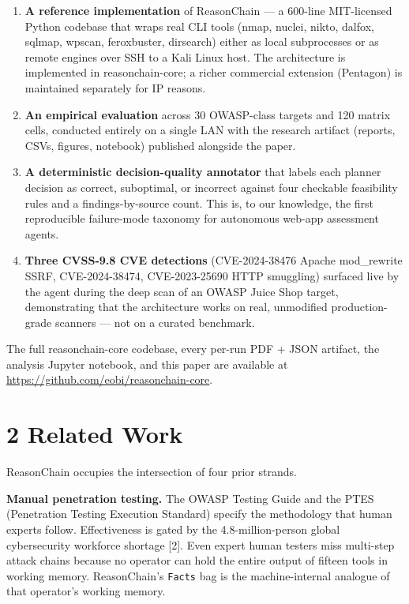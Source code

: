 \documentclass[
]{article}
\begin{document}
\begin{enumerate}
\def\labelenumi{\arabic{enumi}.}
\item
  \textbf{A reference implementation} of ReasonChain --- a 600-line
  MIT-licensed Python codebase that wraps real CLI tools (nmap, nuclei,
  nikto, dalfox, sqlmap, wpscan, feroxbuster, dirsearch) either as local
  subprocesses or as remote engines over SSH to a Kali Linux host. The
  architecture is implemented in reasonchain-core; a richer commercial
  extension (Pentagon) is maintained separately for IP reasons.
\item
  \textbf{An empirical evaluation} across 30 OWASP-class targets and 120
  matrix cells, conducted entirely on a single LAN with the research
  artifact (reports, CSVs, figures, notebook) published alongside the
  paper.
\item
  \textbf{A deterministic decision-quality annotator} that labels each
  planner decision as correct, suboptimal, or incorrect against four
  checkable feasibility rules and a findings-by-source count. This is,
  to our knowledge, the first reproducible failure-mode taxonomy for
  autonomous web-app assessment agents.
\item
  \textbf{Three CVSS-9.8 CVE detections} (CVE-2024-38476 Apache
  mod\_rewrite SSRF, CVE-2024-38474, CVE-2023-25690 HTTP smuggling)
  surfaced live by the agent during the deep scan of an OWASP Juice Shop
  target, demonstrating that the architecture works on real, unmodified
  production-grade scanners --- not on a curated benchmark.
\end{enumerate}

The full reasonchain-core codebase, every per-run PDF + JSON artifact,
the analysis Jupyter notebook, and this paper are available at
\url{https://github.com/eobi/reasonchain-core}.

\section{2 Related Work}\label{related-work}

ReasonChain occupies the intersection of four prior strands.

\textbf{Manual penetration testing.} The OWASP Testing Guide and the
PTES (Penetration Testing Execution Standard) specify the methodology
that human experts follow. Effectiveness is gated by the
4.8-million-person global cybersecurity workforce shortage {[}2{]}. Even
expert human testers miss multi-step attack chains because no operator
can hold the entire output of fifteen tools in working memory.
ReasonChain's \texttt{Facts} bag is the machine-internal analogue of
that operator's working memory.
\end{document}
